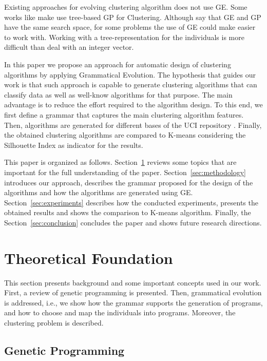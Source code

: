 \documentclass[conference,compsoc]{IEEEtran}
\begin{document}
Existing approaches for evolving clustering algorithm does not use GE. Some works like \cite{ahn2011genetic, xie2006population, boric2007genetic} make use tree-based GP for Clustering. Although \cite{harris2015comparison} say that GE and GP have the same search space, for some problems the use of GE could make easier to work with. Working with a tree-representation for the individuals is more difficult than deal with an integer vector.


In this paper we propose an approach for automatic design of clustering algorithms by applying Grammatical Evolution. The hypothesis that guides our work is that such approach is capable to generate clustering algorithms that can classify data as well as well-know algorithms for that purpose. The main advantage is to reduce the effort required to the algorithm design. To this end, we first define a grammar that captures the main clustering algorithm features. Then, algorithms are generated for different bases of the UCI repository \cite{uci}. Finally, the obtained clustering algorithms are compared to K-means \cite{kanungo2002efficient} considering the Silhouette Index \cite{rousseeuw1987silhouettes} as indicator for the results.


This paper is organized as follows. Section~\ref{sec:theoretical_foudation} reviews some topics that are important for the full understanding of the paper. Section~\ref{sec:methodology} introduces our approach,  describes the grammar proposed for the design of the algorithms and how the algorithms are generated using GE. Section~\ref{sec:experiments} describes how the conducted experiments,  presents the obtained results and shows the comparison to K-means algorithm. Finally, the Section~\ref{sec:conclusion} concludes the paper and shows future research directions.


\section{Theoretical Foundation} \label{sec:theoretical_foudation}


This section presents background and some important concepts used in our work. First, a review of genetic programming is presented. Then, grammatical evolution is addressed, i.e., we show how the grammar supports the generation of programs, and how to choose and map the individuals into programs. Moreover, the clustering problem is described.


\subsection{Genetic Programming}
\end{document}
